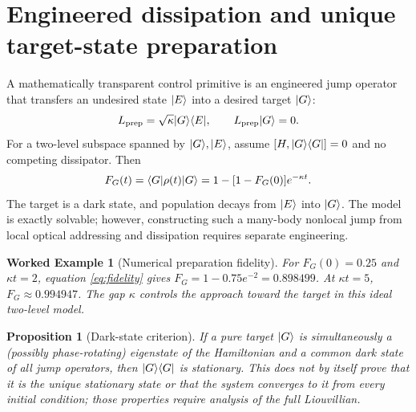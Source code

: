 \documentclass[11pt,a4paper]{article}
\newtheorem{example}{Worked Example}\newtheorem{remark}{Qualification}\newtheorem{proposition}{Proposition}
\begin{document}
\section{Engineered dissipation and unique target-state preparation}
A mathematically transparent control primitive is an engineered jump operator that transfers an undesired state $|E\rangle$ into a desired target $|G\rangle$:
\begin{equation}\label{eq:prep}L_{\rm prep}=\sqrt\kappa|G\rangle\langle E|,\qquad L_{\rm prep}|G\rangle=0.\end{equation}
For a two-level subspace spanned by $|G\rangle,|E\rangle$, assume $[H,|G\rangle\langle G|]=0$ and no competing dissipator. Then
\begin{equation}\label{eq:fidelity}F_G(t)=\langle G|\rho(t)|G\rangle=1-[1-F_G(0)]e^{-\kappa t}.\end{equation}
The target is a dark state, and population decays from $|E\rangle$ into $|G\rangle$. The model is exactly solvable; however, constructing such a many-body nonlocal jump from local optical addressing and dissipation requires separate engineering.
\begin{example}[Numerical preparation fidelity]
For $F_G(0)=0.25$ and $\kappa t=2$, equation \eqref{eq:fidelity} gives $F_G=1-0.75e^{-2}=0.898499$. At $\kappa t=5$, $F_G\approx0.994947$. The gap $\kappa$ controls the approach toward the target in this ideal two-level model.
\end{example}
\begin{proposition}[Dark-state criterion]
If a pure target $|G\rangle$ is simultaneously a (possibly phase-rotating) eigenstate of the Hamiltonian and a common dark state of all jump operators, then $|G\rangle\langle G|$ is stationary. This does not by itself prove that it is the \emph{unique} stationary state or that the system converges to it from every initial condition; those properties require analysis of the full Liouvillian.
\end{proposition}
\end{document}

